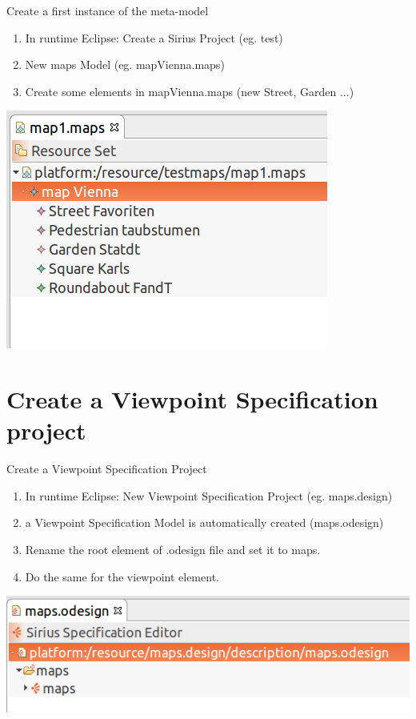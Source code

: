 \begin{frame}{Create a first instance of the meta-model}


	\begin{enumerate}
		\item In runtime Eclipse: Create a Sirius Project (eg. test)
		\item New \ra maps Model (eg. mapVienna.maps)
		\item Create some elements in mapVienna.maps (new Street, Garden ...)
	\end{enumerate}

	\includegraphics[scale=0.3]{figs/mapVienna1.png}

\end{frame}

\section{Create a Viewpoint Specification project}

\begin{frame}{Create a Viewpoint Specification Project}


	\begin{enumerate}
		\item In runtime Eclipse: New \ra Viewpoint Specification Project (eg. maps.design)
		\item a Viewpoint Specification Model is automatically created (maps.odesign)
		\item Rename the root element of .odesign file and set it to maps.
		\item Do the same for the viewpoint element.
	\end{enumerate}

	\centering
	\includegraphics[scale=0.3]{figs/odesign1.png}

\end{frame}

